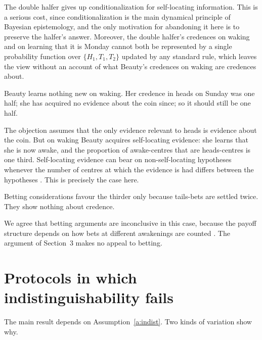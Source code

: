 \documentclass{situationist-preprint}
\begin{document}
\begin{reply}
The double halfer gives up conditionalization for self-locating information. This is a serious cost, since conditionalization is the main dynamical principle of Bayesian epistemology, and the only motivation for abandoning it here is to preserve the halfer's answer. Moreover, the double halfer's credences on waking and on learning that it is Monday cannot both be represented by a single probability function over $\{H_1, T_1, T_2\}$ updated by any standard rule, which leaves the view without an account of what Beauty's credences on waking are credences about.
\end{reply}

\begin{objection}
Beauty learns nothing new on waking. Her credence in heads on Sunday was one half; she has acquired no evidence about the coin since; so it should still be one half.
\end{objection}

\begin{reply}
The objection assumes that the only evidence relevant to heads is evidence about the coin. But on waking Beauty acquires self-locating evidence: she learns that she is now awake, and the proportion of awake-centres that are heads-centres is one third. Self-locating evidence can bear on non-self-locating hypotheses whenever the number of centres at which the evidence is had differs between the hypotheses \citep{Elga2004,Titelbaum2013}. This is precisely the case here.
\end{reply}

\begin{objection}
Betting considerations favour the thirder only because tails-bets are settled twice. They show nothing about credence.
\end{objection}

\begin{reply}
We agree that betting arguments are inconclusive in this case, because the payoff structure depends on how bets at different awakenings are counted \citep{Hitchcock2004}. The argument of Section~3 makes no appeal to betting.
\end{reply}

\section{Protocols in which indistinguishability fails}

The main result depends on Assumption~\ref{a:indist}. Two kinds of variation show why.
\end{document}
